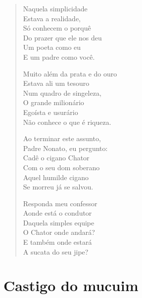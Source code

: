 \begin{verse}
Naquela simplicidade\\
Estava a realidade,\\
Só conhecem o porquê\\
Do prazer que ele nos deu\\
Um poeta como eu\\
E um padre como você.

Muito além da prata e do ouro\\
Estava ali um tesouro\\
Num quadro de singeleza,\\
O grande milionário\\
Egoísta e usurário\\
Não conhece o que é riqueza.

Ao terminar este assunto,\\
Padre Nonato, eu pergunto:\\
Cadê o cigano Chator\\
Com o seu dom soberano\\
Aquel humilde cigano\\
Se morreu já se salvou.

Responda meu confessor\\
Aonde está o condutor\\
Daquela simples equipe\\
O Chator onde andará?\\
E também onde estará\\
A sucata do seu jipe?
\end{verse}

\chapter{Castigo do mucuim}

